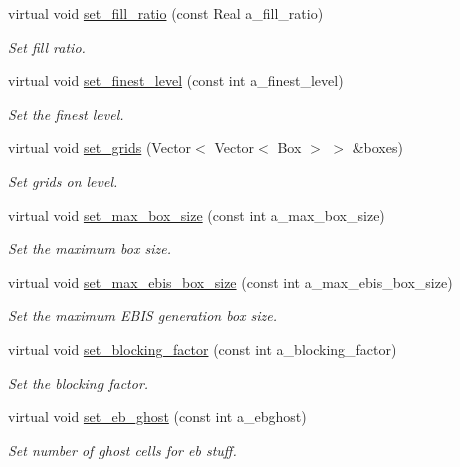 \begin{DoxyCompactItemize}
virtual void \hyperlink{classamr__mesh_aebf6b40aca3c35202e9df254e8e72e4d}{set\+\_\+fill\+\_\+ratio} (const Real a\+\_\+fill\+\_\+ratio)
\begin{DoxyCompactList}\small\item\em Set fill ratio. \end{DoxyCompactList}\item 
virtual void \hyperlink{classamr__mesh_a8ec1616cc3b7c365114d0071b12b561c}{set\+\_\+finest\+\_\+level} (const int a\+\_\+finest\+\_\+level)
\begin{DoxyCompactList}\small\item\em Set the finest level. \end{DoxyCompactList}\item 
virtual void \hyperlink{classamr__mesh_ab5fbf4601c5cc1772a6a531f4fbcb71d}{set\+\_\+grids} (Vector$<$ Vector$<$ Box $>$ $>$ \&boxes)
\begin{DoxyCompactList}\small\item\em Set grids on level. \end{DoxyCompactList}\item 
virtual void \hyperlink{classamr__mesh_a198d71c6ab83bf0e3584d547deead206}{set\+\_\+max\+\_\+box\+\_\+size} (const int a\+\_\+max\+\_\+box\+\_\+size)
\begin{DoxyCompactList}\small\item\em Set the maximum box size. \end{DoxyCompactList}\item 
virtual void \hyperlink{classamr__mesh_a9dfea255def5de74099afffa0f8e650b}{set\+\_\+max\+\_\+ebis\+\_\+box\+\_\+size} (const int a\+\_\+max\+\_\+ebis\+\_\+box\+\_\+size)
\begin{DoxyCompactList}\small\item\em Set the maximum E\+B\+IS generation box size. \end{DoxyCompactList}\item 
virtual void \hyperlink{classamr__mesh_a7ac3b5896698f491339d8d6bcdb64b37}{set\+\_\+blocking\+\_\+factor} (const int a\+\_\+blocking\+\_\+factor)
\begin{DoxyCompactList}\small\item\em Set the blocking factor. \end{DoxyCompactList}\item 
virtual void \hyperlink{classamr__mesh_acd6e43bdfee281c3183e17637dd491f7}{set\+\_\+eb\+\_\+ghost} (const int a\+\_\+ebghost)
\begin{DoxyCompactList}\small\item\em Set number of ghost cells for eb stuff. \end{DoxyCompactList}\item 

\end{DoxyCompactItemize}
